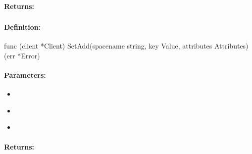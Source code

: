 \paragraph{Returns:}


\pagebreak
\subsubsection{}
\label{api:Go:SetAdd}


\paragraph{Definition:}
\begin{gocode}
func (client *Client) SetAdd(spacename string, key Value, attributes Attributes) (err *Error)
\end{gocode}

\paragraph{Parameters:}
\begin{itemize}[noitemsep]
\item {}\\

\item {}\\

\item {}\\

\end{itemize}

\paragraph{Returns:}


\pagebreak
\subsubsection{}
\label{api:Go:CondSetAdd}


